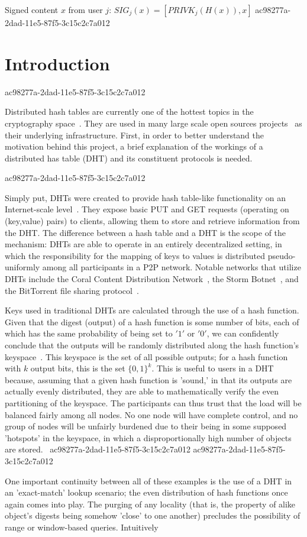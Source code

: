 \documentclass[12pt]{article}
\begin{document}
Signed content $x$ from user $j$: $SIG_j(x) = \left[ PRIVK_j( H(x) ), x \right]$
ac98277a-2dad-11e5-87f5-3c15c2c7a012
\section{Introduction}
ac98277a-2dad-11e5-87f5-3c15c2c7a012\par Distributed hash tables are currently one of the hottest topics in the cryptography space~\cite{Stoica:2001dj,Rowstron:2001ea,Ratnasamy:2001wn}. They are used in many large scale open sources projects~\cite{Freitas:2013tb,Xu:2010vs,Perfitt:2010fh} as their underlying infrastructure. First, in order to better understand the motivation behind this project, a brief explanation of the workings of a distributed has table (DHT) and its constituent protocols is needed.

ac98277a-2dad-11e5-87f5-3c15c2c7a012\par Simply put, DHTs were created to provide hash table-like functionality on an Internet-scale level~\cite{Ratnasamy:2001wn}. They expose basic PUT and GET requests (operating on (key,value) pairs) to clients, allowing them to store and retrieve information from the DHT. The difference between a hash table and a DHT is the scope of the mechanism: DHTs are able to operate in an entirely decentralized setting, in which the responsibility for the mapping of keys to values is distributed pseudo-uniformly among all participants in a P2P network. Notable networks that utilize DHTs include the Coral Content Distribution Network~\cite{Freedman:2004vb}, the Storm Botnet~\cite{Holz:2008uk}, and the BitTorrent file sharing protocol~\cite{Cohen:y1_8mBnw}.

\par Keys used in traditional DHTs are calculated through the use of a hash function. Given that the digest (output) of a hash function is some number of bits, each of which has the same probability of being set to $'1'$ or $'0'$, we can confidently conclude that the outputs will be randomly distributed along the hash function's keyspace~. This keyspace is the set of all possible outputs; for a hash function with $k$ output bits, this is the set $\{0,1\}^k$. This is useful to users in a DHT because, assuming that a given hash function is 'sound,' in that its outputs are actually evenly distributed, they are able to mathematically verify the even partitioning of the keyspace. The participants can thus trust that the load will be balanced fairly among all nodes. No one node will have complete control, and no group of nodes will be unfairly burdened due to their being in some supposed 'hotspots' in the keyspace, in which a disproportionally high number of objects are stored.~
ac98277a-2dad-11e5-87f5-3c15c2c7a012
ac98277a-2dad-11e5-87f5-3c15c2c7a012\par One important continuity between all of these examples is the use of a DHT in an 'exact-match' lookup scenario; the even distribution of hash functions once again comes into play. The purging of any locality (that is, the property of alike object's digests being somehow 'close' to one another) precludes the possibility of range or window-based queries. Intuitively
\end{document}

